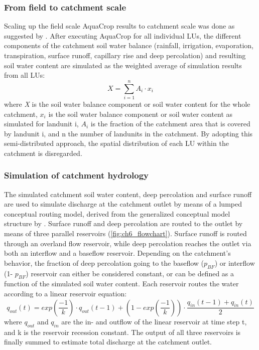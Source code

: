 \subsubsection{From field to catchment scale}
Scaling up the field scale AquaCrop results to catchment scale was done as suggested by \textcite{wesseling2006}. After executing AquaCrop for all individual LUs, the different components of the catchment soil water balance (rainfall, irrigation, evaporation, transpiration, surface runoff, capillary rise and deep percolation) and resulting soil water content are simulated as the weighted average of simulation results from all LUs: 
\begin{equation}
 X=\sum_{i=1}^n A_i \cdot x_i
  \label{eq:ch6_SWBcatch}
\end{equation}
where \textit{X} is the soil water balance component or soil water content for the whole catchment, $x_i$ is the soil water balance component or soil water content as simulated for landunit i, $A_i$ is the fraction of the catchment area that is covered by landunit i, and n the number of landunits in the catchment. By adopting this semi-distributed approach, the spatial distribution of each LU within the catchment is disregarded.

\subsubsection{Simulation of catchment hydrology}
The simulated catchment soil water content, deep percolation and surface runoff are used to simulate discharge at the catchment outlet by means of a lumped conceptual routing model, derived from the generalized conceptual model structure by \textcite{willems2014a}. Surface runoff and deep percolation are routed to the outlet by means of three parallel reservoirs (\autoref{fig:ch6_flowchart}). Surface runoff is routed through an overland flow reservoir, while deep percolation reaches the outlet via both an interflow and a baseflow reservoir. Depending on the catchment's behavior, the fraction of deep percolation going to the baseflow ($p_{BF}$) or interflow (1- $p_{BF}$) reservoir can either be considered constant, or can be defined as a function of the simulated soil water content. Each reservoir routes the water according to a linear reservoir equation: 
\begin{equation}
 q_{out}(t)=exp \left(\dfrac{-1}{k}\right) \cdot q_{out}(t-1) + \left( 1-exp \left(\dfrac{-1}{k}\right) \right)\cdot \dfrac{q_{in}(t-1)+q_{in}(t)}{2} 
  \label{eq:ch6_linres}
\end{equation}
where $q_{out}$ and $q_{in}$ are the in- and outflow of the linear reservoir at time step t, and k is the reservoir recession constant. The output of all three reservoirs is finally summed to estimate total discharge at the catchment outlet.

